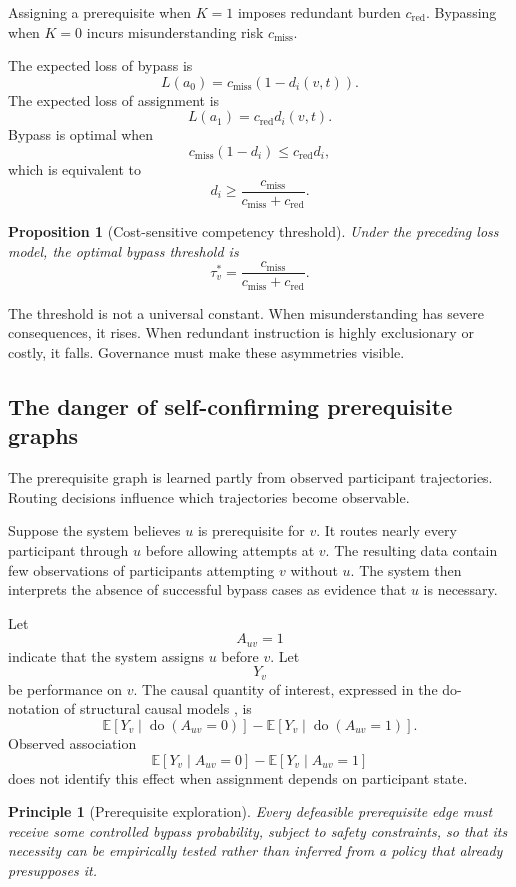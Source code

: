 \documentclass[11pt]{article}
\newtheorem{proposition}[definition]{Proposition}
\newtheorem{principle}[definition]{Principle}
\theoremstyle{definition}
\newcommand{\E}{\mathbb{E}}
\begin{document}
Assigning a prerequisite when \(K=1\) imposes redundant burden \(c_{\mathrm{red}}\). Bypassing when \(K=0\) incurs misunderstanding risk \(c_{\mathrm{miss}}\).

The expected loss of bypass is
\[
L(a_0)
=
c_{\mathrm{miss}}(1-d_i(v,t)).
\]
The expected loss of assignment is
\[
L(a_1)
=
c_{\mathrm{red}}d_i(v,t).
\]
Bypass is optimal when
\[
c_{\mathrm{miss}}(1-d_i)
\leq
c_{\mathrm{red}}d_i,
\]
which is equivalent to
\[
d_i
\geq
\frac{c_{\mathrm{miss}}}
{c_{\mathrm{miss}}+c_{\mathrm{red}}}.
\]

\begin{proposition}[Cost-sensitive competency threshold]
Under the preceding loss model, the optimal bypass threshold is
\[
\tau_v^{*}
=
\frac{c_{\mathrm{miss}}}
{c_{\mathrm{miss}}+c_{\mathrm{red}}}.
\]
\end{proposition}

The threshold is not a universal constant. When misunderstanding has severe consequences, it rises. When redundant instruction is highly exclusionary or costly, it falls. Governance must make these asymmetries visible.

\subsection{The danger of self-confirming prerequisite graphs}

The prerequisite graph is learned partly from observed participant trajectories. Routing decisions influence which trajectories become observable.

Suppose the system believes \(u\) is prerequisite for \(v\). It routes nearly every participant through \(u\) before allowing attempts at \(v\). The resulting data contain few observations of participants attempting \(v\) without \(u\). The system then interprets the absence of successful bypass cases as evidence that \(u\) is necessary.

Let
\[
A_{uv}=1
\]
indicate that the system assigns \(u\) before \(v\). Let
\[
Y_v
\]
be performance on \(v\). The causal quantity of interest, expressed in the do-notation of structural causal models \cite{pearl2009,hernan2020}, is
\[
\E[Y_v\mid\operatorname{do}(A_{uv}=0)]
-
\E[Y_v\mid\operatorname{do}(A_{uv}=1)].
\]
Observed association
\[
\E[Y_v\mid A_{uv}=0]
-
\E[Y_v\mid A_{uv}=1]
\]
does not identify this effect when assignment depends on participant state.

\begin{principle}[Prerequisite exploration]
Every defeasible prerequisite edge must receive some controlled bypass probability, subject to safety constraints, so that its necessity can be empirically tested rather than inferred from a policy that already presupposes it.
\end{principle}
\end{document}
